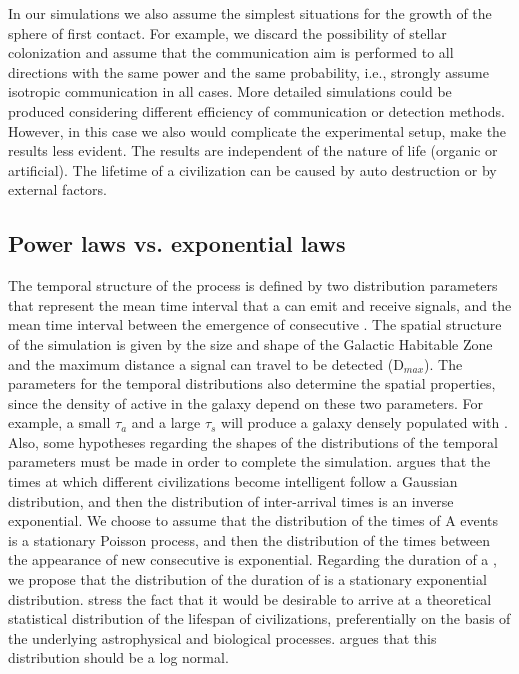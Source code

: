 In our simulations we also assume the simplest situations for the
growth of the sphere of first contact.
%
For example, we discard the possibility of stellar colonization
\citep[e.g.][]{newman_galactic_1981, walters_interstellar_1980,
starling_virulence_2013, barlow_galactic_2012, jeong_large_2000,
maccone_mathematical_2011} and assume that the communication aim is
performed to all directions with the same power and the same
probability, i.e., strongly assume isotropic communication in all
cases.
%
More detailed simulations could be produced considering different
efficiency of communication or detection methods.
%
However, in this case we also would complicate the experimental setup,
make the results less evident.
%
The results are independent of the nature of life (organic or
artificial).
%
The lifetime of a civilization can be caused by auto destruction or by
external factors.


 
\subsection{Power laws vs. exponential laws}\label{SS_PDF_shape}

The temporal structure of the process is defined by two distribution
parameters that represent the mean time interval that a \ceti{}
can emit and receive signals, and the mean time interval
between the emergence of consecutive \cetis{}.
%
The spatial structure of the simulation is given by the size and shape
of the Galactic Habitable Zone and the maximum distance a signal can
travel to be detected (D$_{max}$).
%
The parameters for the temporal distributions also determine the
spatial properties, since the density of active \cetis{} in the galaxy
depend on these two parameters.
%
For example, a small $\tau_a$ and a large $\tau_s$ will produce a
galaxy densely populated with \cetis{}.
%
Also, some hypotheses regarding the shapes of the distributions of the
temporal parameters must be made in order to complete the
simulation.
%
\citet{forgan_spatiotemporal_2011} argues that the times at which
different civilizations become intelligent follow a Gaussian
distribution, and then the distribution of inter-arrival times is an
inverse exponential.
%
We choose to assume that the distribution of the times of A events is a
stationary Poisson process, and then the distribution of the times
between the appearance of new consecutive \cetis{} is exponential.
%
Regarding the duration of a \ceti{}, we propose that the distribution
of the duration of \cetis{} is a stationary exponential distribution.
%
\citet{balbi_impact_2018} stress the fact that it would be desirable
to arrive at a theoretical statistical distribution of the lifespan of
civilizations, preferentially on the basis of the underlying
astrophysical and biological processes.
%
\citet{maccone_lognormals_2014} argues that this distribution should
be a log normal.


